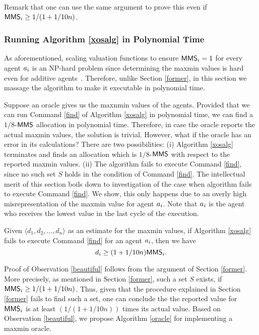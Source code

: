 Remark that one can use the same argument to prove this even if $\mathsf{MMS}_i \geq 1/(1+1/10n)$.

\subsubsection{Running Algorithm \ref{xosalg} in Polynomial Time}\label{latter}
As aforementioned, scaling valuation functions to ensure $\mathsf{MMS}_i = 1$ for every agent $a_i$ is an NP-hard problem since determining the maxmin values is hard even for additive agents~\cite{Procaccia:first}. Therefore, unlike Section \ref{former}, in this section we massage the algorithm to make it executable in polynomial time.

Suppose an oracle gives us the maxnmin values of the agents. Provided that we can run Command \ref{find} of Algorithm \ref{xosalg} in polynomial time, we can find a $1/8$-$\mathsf{MMS}$ allocation in polynomial time. Therefore, in case the oracle reports the actual maxmin values, the solution is trivial. However, what if the oracle has an error in its calculations? There are two possibilities: (i) Algorithm \ref{xosalg} terminates and finds an allocation which is $1/8$-$\mathsf{MMS}$ with respect to the reported maxmin values. (ii) The algorithm fails to execute Command \ref{find}, since no such set $S$ holds in the condition of Command \ref{find}. The intellectual merit of this section boils down to investigation of the case when algorithm fails to execute Command \ref{find}. We show, this only happens due to an overly high misrepresentation of the maxmin value for agent $a_i$. Note that $a_i$ is the agent who receives the lowest value in the last cycle of the execution.

\begin{observation}\label{beautiful}
	Given $\langle d_1, d_2, \ldots, d_n\rangle$ as an estimate for the maxmin values, if Algorithm \ref{xosalg} fails to execute Command \ref{find} for an agent $a_i$, then we have
	$$d_i \geq (1+1/10n) \mathsf{MMS}_i.$$
\end{observation} 
Proof of Observation \ref{beautiful} follows from the argument of Section \ref{former}. More precisely, as mentioned in Section \ref{former}, such a set $S$ exists, if $\mathsf{MMS}_i \geq 1/(1+1/10n)$. Thus, given that the procedure explained in Section \ref{former} fails to find such a set, one can conclude the the reported value for $\mathsf{MMS}_i$ is at least $(1/(1+1/10n))$ times its actual value. Based on Observation \ref{beautiful}, we propose Algorithm \ref{oracle} for implementing a maxmin oracle.

